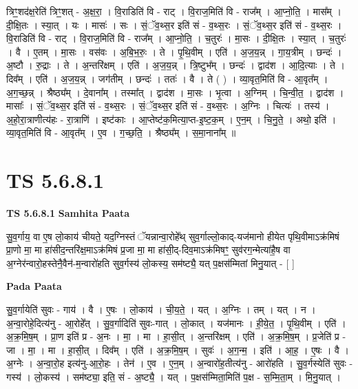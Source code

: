 \documentclass[17pt]{extarticle}
\begin{document}
त्रिꣳ॒॒शद॑क्ष॒रेति॑ त्रिꣳ॒॒शत् - अ॒क्ष॒रा॒ । वि॒राडिति॑ वि - राट् । वि॒राज॒मिति॑ वि - राज᳚म् । आ॒प्नो॒ति॒ । मास᳚म् । दी॒क्षि॒तः । स्या॒त् । यः । मासः॑ । सः । सं॒ॅव॒थ्स॒र इति॑ सं - व॒थ्स॒रः । सं॒ॅव॒थ्स॒र इति॑ सं - व॒थ्स॒रः । वि॒राडिति॑ वि - राट् । वि॒राज॒मिति॑ वि - राज᳚म् । आ॒प्नो॒ति॒ । च॒तुरः॑ । मा॒सः । दी॒क्षि॒तः । स्या॒त् । च॒तुरः॑ । वै । ए॒तम् । मा॒सः । वस॑वः । अ॒बि॒भ॒रुः॒ । ते । पृ॒थि॒वीम् । एति॑ । अ॒ज॒य॒न्न् । गा॒य॒त्रीम् । छन्दः॑ । अ॒ष्टौ । रु॒द्राः । ते । अ॒न्तरि॑क्षम् । एति॑ । अ॒ज॒य॒न्न् । त्रि॒ष्टुभ᳚म् । छन्दः॑ । द्वाद॑श । आ॒दि॒त्याः । ते । दिव᳚म् । एति॑ । अ॒ज॒य॒न्न् । जग॑तीम् । छन्दः॑ । ततः॑ । वै । ते ( ) । व्या॒वृत॒मिति॑ वि - आ॒वृत᳚म् । अ॒ग॒च्छ॒न्न् । श्रैष्ठ्य᳚म् । दे॒वाना᳚म् । तस्मा᳚त् । द्वाद॑श । मा॒सः । भृ॒त्वा । अ॒ग्निम् । चि॒न्वी॒त॒ । द्वाद॑श । मासाः᳚ । सं॒ॅव॒थ्स॒र इति॑ सं - व॒थ्स॒रः । सं॒ॅव॒थ्स॒र इति॑ सं - व॒थ्स॒रः । अ॒ग्निः । चित्यः॑ । तस्य॑ । अ॒हो॒रा॒त्राणीत्य॑हः - रा॒त्राणि॑ । इष्ट॑काः । आ॒प्तेष्ट॑क॒मित्या॒प्त-इ॒ष्ट॒क॒म् । ए॒न॒म् । चि॒नु॒ते॒ । अथो॒ इति॑ । व्या॒वृत॒मिति॑ वि - आ॒वृत᳚म् । ए॒व । ग॒च्छ॒ति॒ । श्रैष्ठ्य᳚म् । स॒मा॒नाना᳚म् ॥  \newline





\section{ TS 5.6.8.1 }

\textbf{TS 5.6.8.1 } \newline
\textbf{Samhita Paata} \newline

सु॒व॒र्गाय॒ वा ए॒ष लो॒काय॑ चीयते॒ यद॒ग्निस्तं ॅयन्नान्वा॒रोहे᳚थ् सुव॒र्गाल्लो॒काद्-यज॑मानो हीयेत पृथि॒वीमाऽक्र॑मिषं प्रा॒णो मा॒ मा हा॑सीद॒न्तरि॑क्ष॒माऽक्र॑मिषं प्र॒जा मा॒ मा हा॑सी॒द्-दिव॒माऽक्र॑मिषꣳ॒॒ सुव॑रग॒न्मेत्या॑है॒ष वा अ॒ग्नेर॑न्वारो॒हस्तेनै॒वैन॑-म॒न्वारो॑हति सुव॒र्गस्य॑ लो॒कस्य॒ सम॑ष्ट्यै॒ यत् प॒क्षस॑म्मितां मिनु॒यात् - [  ] \newline

\textbf{Pada Paata} \newline

सु॒व॒र्गायेति॑ सुवः - गाय॑ । वै । ए॒षः । लो॒काय॑ । ची॒य॒ते॒ । यत् । अ॒ग्निः । तम् । यत् । न । अ॒न्वा॒रोहे॒दित्य॑नु - आ॒रोहे᳚त् । सु॒व॒र्गादिति॑ सुवः-गात् । लो॒कात् । यज॑मानः । ही॒ये॒त॒ । पृ॒थि॒वीम् । एति॑ । अ॒क्र॒मि॒ष॒म् । प्रा॒ण इति॑ प्र - अ॒नः । मा॒ । मा । हा॒सी॒त् । अ॒न्तरि॑क्षम् । एति॑ । अ॒क्र॒मि॒ष॒म् । प्र॒जेति॑ प्र - जा । मा॒ । मा । हा॒सी॒त् । दिव᳚म् । एति॑ । अ॒क्र॒मि॒ष॒म् । सुवः॑ । अ॒ग॒न्म॒ । इति॑ । आ॒ह॒ । ए॒षः । वै । अ॒ग्नेः । अ॒न्वा॒रो॒ह इत्य॑नु-आ॒रो॒हः । तेन॑ । ए॒व । ए॒न॒म् । अ॒न्वारो॑ह॒तीत्य॑नु - आरो॑हति । सु॒व॒र्गस्येति॑ सुवः - गस्य॑ । लो॒कस्य॑ । सम॑ष्ट्या॒ इति॒ सं - अ॒ष्ट्यै॒ । यत् । प॒क्षस॑म्मिता॒मिति॑ प॒क्ष - स॒म्मि॒ता॒म् । मि॒नु॒यात् ।  \newline
\end{document}
